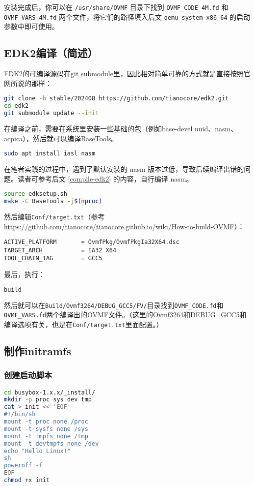 安装完成后，你可以在 \texttt{/usr/share/OVMF} 目录下找到 \texttt{OVMF\_CODE\_4M.fd} 和 \texttt{OVMF\_VARS\_4M.fd} 两个文件，将它们的路径填入后文 \texttt{qemu-system-x86\_64} 的启动参数中即可使用。

\subsection{EDK2编译（简述）}

EDK2的可编译源码在git submodule里，因此相对简单可靠的方式就是直接按照官网所说的那样：
\begin{lstlisting}[language=bash]
git clone -b stable/202408 https://github.com/tianocore/edk2.git
cd edk2
git submodule update --init
\end{lstlisting}

在编译之前，需要在系统里安装一些基础的包（例如base-devel uuid、nasm、acpica），然后就可以编译BaseTools。

\begin{lstlisting}[language=bash]
    sudo apt install iasl nasm
\end{lstlisting}

在笔者实践的过程中，遇到了默认安装的 nasm 版本过低，导致后续编译出错的问题。读者可参考后文 \ref{compile-edk2} 的内容，自行编译 nasm。

\begin{lstlisting}[language=bash]
source edksetup.sh
make -C BaseTools -j$(nproc)
\end{lstlisting}
然后编辑\texttt{Conf/target.txt}（参考\url{https://github.com/tianocore/tianocore.github.io/wiki/How-to-build-OVMF}）：
\begin{lstlisting}
ACTIVE_PLATFORM       = OvmfPkg/OvmfPkgIa32X64.dsc
TARGET_ARCH           = IA32 X64
TOOL_CHAIN_TAG        = GCC5
\end{lstlisting}
最后，执行：
\begin{lstlisting}[language=bash]
build
\end{lstlisting}
然后就可以在\texttt{Build/Ovmf3264/DEBUG\_GCC5/FV/}目录找到\texttt{OVMF\_CODE.fd}和\texttt{OVMF\_VARS.fd}两个编译出的OVMF文件。（这里的Ovmf3264和DEBUG\_GCC5和编译选项有关，也是在\texttt{Conf/target.txt}里面配置。）

\subsection{制作initramfs}
\subsubsection{创建启动脚本}
\begin{lstlisting}[language=bash, language=bash, showstringspaces=false]
cd busybox-1.x.x/_install/
mkdir -p proc sys dev tmp
cat > init << 'EOF'
#!/bin/sh
mount -t proc none /proc
mount -t sysfs none /sys
mount -t tmpfs none /tmp
mount -t devtmpfs none /dev
echo "Hello Linux!"
sh
poweroff -f
EOF
chmod +x init
\end{lstlisting}

